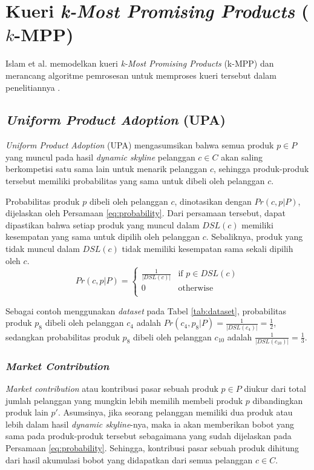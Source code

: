 \section{Kueri \textit{k-Most Promising Products} ($k$-MPP)}
\tab Islam et al. memodelkan kueri \textit{k-Most Promising Products} (k-MPP) dan merancang algoritme pemrosesan untuk memproses kueri tersebut dalam penelitiannya \cite{kmpp}.

\subsection{\textit{Uniform Product Adoption} (UPA)}
\tab \textit{Uniform Product Adoption} (UPA) mengasumsikan bahwa semua produk $p \in P$ yang muncul pada hasil \textit{dynamic skyline} pelanggan $c \in C$ akan saling berkompetisi satu sama lain untuk menarik pelanggan $c$, sehingga produk-produk tersebut memiliki probabilitas yang sama untuk dibeli oleh pelanggan $c$.

Probabilitas produk $p$ dibeli oleh pelanggan $c$, dinotasikan dengan $Pr(c, p|P)$, dijelaskan oleh Persamaan \ref{eq:probability}. Dari persamaan tersebut, dapat dipastikan bahwa setiap produk yang muncul dalam $DSL(c)$ memiliki kesempatan yang sama untuk dipilih oleh pelanggan $c$. Sebaliknya, produk yang tidak muncul dalam $DSL(c)$ tidak memiliki kesempatan sama sekali dipilih oleh $c$.
\begin{equation}\label{eq:probability}
Pr(c, p|P) = \left\{
				\begin{array}{ll}
					\frac{1}{|DSL(c)|} & \text{if } p \in DSL(c)\\
					0 & \text{otherwise}\\
				\end{array}
				\right.
\end{equation}

Sebagai contoh menggunakan \textit{dataset} pada Tabel \ref{tab:dataset}, probabilitas produk $p_8$ dibeli oleh pelanggan $c_4$ adalah $Pr(c_4, p_8|P) = \frac{1}{|DSL(c_4)|} = \frac{1}{2}$, sedangkan probabilitas produk $p_8$ dibeli oleh pelanggan $c_{10}$ adalah $\frac{1}{|DSL(c_{10})|} = \frac{1}{3}$.

\subsubsection{\textit{Market Contribution}}
\tab \textit{Market contribution} atau kontribusi pasar sebuah produk $p \in P$ diukur dari total jumlah pelanggan yang mungkin lebih memilih membeli produk $p$ dibandingkan produk lain $p'$. Asumsinya, jika seorang pelanggan memiliki dua produk atau lebih dalam hasil \textit{dynamic skyline}-nya, maka ia akan memberikan bobot yang sama pada produk-produk tersebut sebagaimana yang sudah dijelaskan pada Persamaan \ref{eq:probability}. Sehingga, kontribusi pasar sebuah produk dihitung dari hasil akumulasi bobot yang didapatkan dari semua pelanggan $c \in C$.

